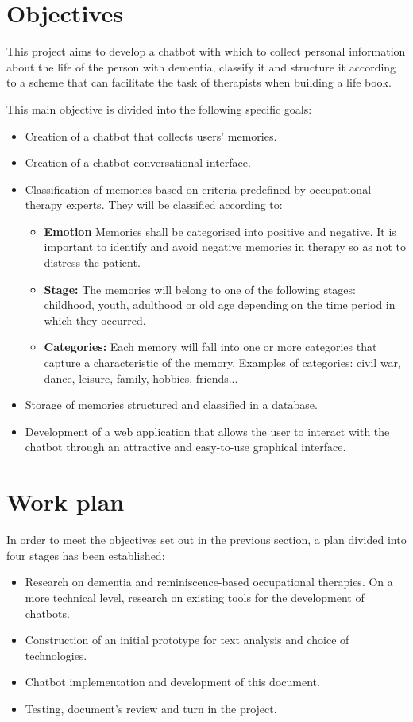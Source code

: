 \section{Objectives}

This project aims to develop a chatbot with which to collect personal information about the life of the person with dementia, classify it and structure it according to a scheme that can facilitate the task of therapists when building a life book.

This main objective is divided into the following specific goals:
\begin{itemize}
	\item Creation of a chatbot that collects users' memories.
	\item Creation of a chatbot conversational interface.
	\item Classification of memories based on criteria predefined by occupational therapy experts. They will be classified according to:
	\begin{itemize}
		\item \textbf{Emotion} Memories shall be categorised into positive and negative. It is important to identify and avoid negative memories in therapy so as not to distress the patient.
		\item \textbf{Stage:} The memories will belong to one of the following stages: childhood, youth, adulthood or old age depending on the time period in which they occurred.
		\item \textbf{Categories:} Each memory will fall into one or more categories that capture a characteristic of the memory. Examples of categories: civil war, dance, leisure, family, hobbies, friends...
	\end{itemize}
	\item Storage of memories structured and classified in a database.
	\item Development of a web application that allows the user to interact with the chatbot through an attractive and easy-to-use graphical interface.
\end{itemize}

\section{Work plan}

In order to meet the objectives set out in the previous section, a plan divided into four stages has been established:
\begin{itemize}
	\item Research on dementia and reminiscence-based occupational therapies. On a more technical level, research on existing tools for the development of chatbots.
	\item Construction of an initial prototype for text analysis and choice of technologies.
	\item Chatbot implementation and development of this document.
	\item Testing, document's review and turn in the project.
\end{itemize}

